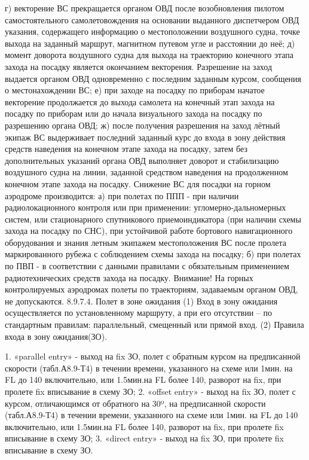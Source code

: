 г)	векторение ВС прекращается органом ОВД после возобновления пилотом самостоятельного самолетовождения на основании выданного диспетчером ОВД указания, содержащего информацию о местоположении воздушного судна, точке выхода на заданный маршрут, магнитном путевом угле и расстоянии до неё; 
д)	момент доворота воздушного судна для выхода на траекторию конечного этапа захода на посадку является окончанием векторения. Разрешение на заход выдается органом ОВД одновременно с последним заданным курсом, сообщения о местонахождении ВС; 
е)	при заходе на посадку по приборам начатое векторение продолжается до выхода самолета на конечный этап захода на посадку по приборам или до начала визуального захода на посадку по разрешению органа ОВД; 
ж)	после получения разрешения на заход лётный экипаж ВС выдерживает последний заданный курс до входа в зону действия средств наведения на конечном этапе захода на посадку, затем без дополнительных указаний органа ОВД выполняет доворот и стабилизацию воздушного судна на линии, заданной средством наведения на продолженном конечном этапе захода на посадку.
Снижение ВС для посадки на горном аэродроме производится:
а)	при полетах по ППП - при наличии радиолокационного контроля или при применении: угломерно-дальномерных систем, или стационарного спутникового приемоиндикатора (при наличии схемы захода на посадку по СНС), при устойчивой работе бортового навигационного оборудования и знания летным экипажем местоположения ВС после пролета маркированного рубежа с соблюдением схемы захода на посадку;
б)	при полетах по ПВП - в соответствии с данными правилами с обязательным применением радиотехнических средств захода на посадку.
Внимание! На горных контролируемых аэродромах полеты по траекториям, задаваемым органом ОВД, не допускаются.
8.9.7.4.	Полет в зоне ожидания
(1) Вход в зону ожидания осуществляется по установленному маршруту, а при его отсутствии – по стандартным правилам: параллельный, смещенный или прямой вход.
(2) Правила входа в зону ожидания(ЗО).     
 
1. «parallel entry» - выход на fix ЗО, полет с обратным курсом на предписанной скорости (табл.А8.9-Т4) в течении времени, указанного на схеме или 1мин. на FL до 140 включительно, или 1.5мин.на FL более 140, разворот на fix, при пролете fix вписывание в схему ЗО;
2. «offset entry» - выход на fix ЗО, полет с курсом, отличающимся от обратного на 30º, на предписанной скорости (табл.А8.9-Т4) в течении времени, указанного на схеме или 1мин. на FL до 140 включительно, или 1.5мин.на FL более 140, разворот на fix, при пролете fix вписывание в схему ЗО;
3. «direct entry» - выход на fix ЗО, при пролете fix вписывание в схему ЗО.

